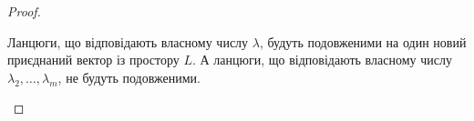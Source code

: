 \begin{proof}

\begin{lemma}
Ланцюги, що відповідають власному числу $\lambda$, будуть подовженими на один новий приєднаний вектор із простору $L$. А ланцюги, що відповідають власному числу $\lambda_2,\dots,\lambda_m$, не будуть подовженими.
\end{lemma}


\end{proof}

